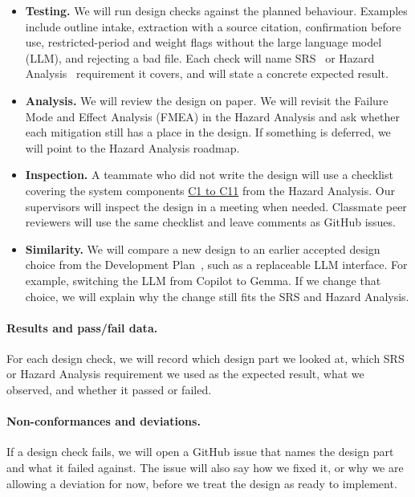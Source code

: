 \documentclass[12pt, titlepage]{article}
\begin{document}
\begin{itemize}
\item \textbf{Testing.} We will run design checks against the planned behaviour. Examples include outline intake, extraction with a source citation, confirmation before use, restricted-period and weight flags without the large language model (LLM), and rejecting a bad file. Each check will name SRS~\citep{TeamBVSH2026SRS} or Hazard Analysis~\citep{TeamBVSH2026HA} requirement it covers, and will state a concrete expected result.
\item \textbf{Analysis.} We will review the design on paper. We will revisit the Failure Mode and Effect Analysis (FMEA) in the Hazard Analysis and ask whether each mitigation still has a place in the design. If something is deferred, we will point to the Hazard Analysis roadmap.
\item \textbf{Inspection.} A teammate who did not write the design will use a checklist covering the system components \href{https://github.com/shivyam/cas-course-optimization/blob/main/docs/HazardAnalysis/HazardAnalysis.tex\#L129}{C1 to C11} from the Hazard Analysis. Our supervisors will inspect the design in a meeting when needed. Classmate peer reviewers will use the same checklist and leave comments as GitHub issues.
\item \textbf{Similarity.} We will compare a new design to an earlier accepted design choice from the Development Plan~\citep{TeamBVSH2026DP}, such as a replaceable LLM interface. For example, switching the LLM from Copilot to Gemma. If we change that choice, we will explain why the change still fits the SRS and Hazard Analysis.
\end{itemize}

\paragraph{Results and pass/fail data.}
For each design check, we will record which design part we looked at, which SRS or Hazard Analysis requirement we used as the expected result, what we observed, and whether it passed or failed.

\paragraph{Non-conformances and deviations.}
If a design check fails, we will open a GitHub issue that names the design part and what it failed against. The issue will also say how we fixed it, or why we are allowing a deviation for now, before we treat the design as ready to implement.
\end{document}
